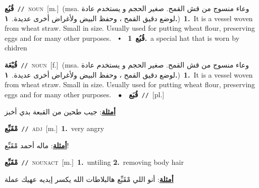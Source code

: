 \documentclass[10pt,a4paper,twoside]{article} %
\begin{document}
\begin{multicols}{2}
{{{{{{{{\setlength\topsep{0pt}\textbf{\foreignlanguage{arabic}{قُبُع}}\ {\color{gray}\texttt{//}\color{black}}\ \textsc{noun}\ [m.]\ \color{gray}(msa. \foreignlanguage{arabic}{وعاء منسوج من قش القمح. صغير الحجم و يستخدم عادة لوضع دقيق القمح ، وحفظ البيض ولأغراض أخرى عديدة.}~\foreignlanguage{arabic}{\textbf{١.}})\color{black}\ \textbf{1.}~It is a vessel woven from wheat straw. Small in size. Usually used for putting wheat flour, preserving eggs and for many other purposes.\ \ $\smblkdiamond$\ \ \setlength\topsep{0pt}\textbf{\foreignlanguage{arabic}{قُبُع}}\ \textbf{1.}~a special hat that is worn by chidren\ 

{\setlength\topsep{0pt}\textbf{\foreignlanguage{arabic}{قُبْعَة}}\ {\color{gray}\texttt{//}\color{black}}\ \textsc{noun}\ [f.]\ \color{gray}(msa. \foreignlanguage{arabic}{وعاء منسوج من قش القمح. صغير الحجم و يستخدم عادة لوضع دقيق القمح ، وحفظ البيض ولأغراض أخرى عديدة.}~\foreignlanguage{arabic}{\textbf{١.}})\color{black}\ \textbf{1.}~It is a vessel woven from wheat straw. Small in size. Usually used for putting wheat flour, preserving eggs and for many other purposes.\ \ $\bullet$\ \ \setlength\topsep{0pt}\textbf{\foreignlanguage{arabic}{قُبَع}}\ {\color{gray}\texttt{//}\color{black}}\ [pl.]\  \begin{flushright}\color{gray}\foreignlanguage{arabic}{\textbf{\underline{\foreignlanguage{arabic}{أمثلة}}}: جيب طحين من القبعة بدي أخبز}\end{flushright}\color{black}} \vspace{2mm}

{\setlength\topsep{0pt}\textbf{\foreignlanguage{arabic}{مْقَبِّع}}\ {\color{gray}\texttt{//}\color{black}}\ \textsc{adj}\ [m.]\ \textbf{1.}~very angry\  \begin{flushright}\color{gray}\foreignlanguage{arabic}{\textbf{\underline{\foreignlanguage{arabic}{أمثلة}}}: ماله أحمد مْقَبِّع!}\end{flushright}\color{black}} \vspace{2mm}

{\setlength\topsep{0pt}\textbf{\foreignlanguage{arabic}{مْقَبِّع}}\ {\color{gray}\texttt{//}\color{black}}\ \textsc{noun\textunderscore act}\ [m.]\ \textbf{1.}~untiling  \textbf{2.}~removing body hair\  \begin{flushright}\color{gray}\foreignlanguage{arabic}{\textbf{\underline{\foreignlanguage{arabic}{أمثلة}}}: أنو اللي مْقَبِّع هالبلاطات الله يكسر إيديه عهيك عملة}\end{flushright}\color{black}} \vspace{2mm}

}}}}}}}}
\end{multicols}
\end{document}

